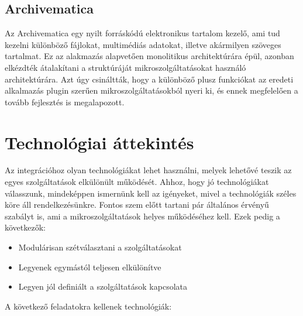 \documentclass[11pt,magyar,a4paper,oneside,]{report}
\providecommand{\tightlist}{%
  \setlength{\itemsep}{0pt}\setlength{\parskip}{0pt}}
\begin{document}
\section{\texorpdfstring{Archivematica
\citep{archivematica}}{Archivematica {[}@archivematica{]}}}\label{archivematica-archivematica}

Az Archivematica egy nyilt forráskódú elektronikus tartalom kezelő, ami
tud kezelni különböző fájlokat, multimédiás adatokat, illetve akármilyen
szöveges tartalmat. Ez az alakmazás alapvetően monolitikus
architektúrára épül, azonban elkézdték átalakítani a struktúráját
mikroszolgáltatásokat használó architektúrára. Azt úgy csináltták, hogy
a különböző plusz funkciókat az eredeti alkalmazás plugin szerűen
mikroszolgáltatásokból nyeri ki, és ennek megfelelően a tovább
fejlesztés is megalapozott\citep{archivematica-wiki}.

\chapter{\texorpdfstring{Technológiai
áttekintés\citep{micro-introPt1}}{Technológiai áttekintés{[}@micro-introPt1{]}}}\label{technoluxf3giai-uxe1ttekintuxe9smicro-intropt1}

Az integrációhoz olyan technológiákat lehet használni, melyek lehetővé
teszik az egyes szolgáltatások elkülönült működését. Ahhoz, hogy jó
technológiákat válasszunk, mindeképpen ismernünk kell az igényeket,
mivel a technológiák széles köre áll rendelkezésünkre. Fontos szem előtt
tartani pár általános érvényű szabályt is\citep{micro-golden}, ami a
mikroszolgáltatások helyes működéséhez kell. Ezek pedig a következők:

\begin{itemize}
\tightlist
\item
  Modulárisan szétválasztani a szolgáltatásokat
\item
  Legyenek egymástól teljesen elkülönítve
\item
  Legyen jól definiált a szolgáltatások kapcsolata
\end{itemize}

A következő feladatokra kellenek technológiák:
\end{document}
